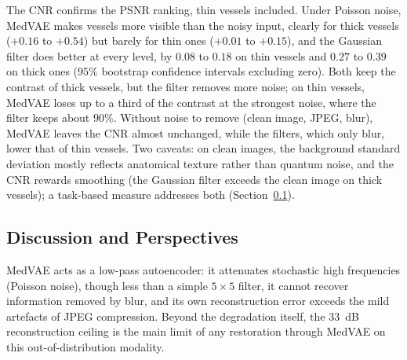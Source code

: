 \documentclass[conference]{IEEEtran}
\begin{document}
The CNR confirms the PSNR ranking, thin vessels included. Under Poisson
noise, MedVAE makes vessels more visible than the noisy input, clearly
for thick vessels ($+0.16$ to $+0.54$) but barely for thin ones ($+0.01$
to $+0.15$), and the Gaussian filter does better at every level, by
$0.08$ to $0.18$ on thin vessels and $0.27$ to $0.39$ on thick ones
($95\%$ bootstrap confidence intervals excluding zero). Both keep the
contrast of thick vessels, but the filter removes more noise; on thin
vessels, MedVAE loses up to a third of the contrast at the strongest
noise, where the filter keeps about $90\%$. Without noise to remove
(clean image, JPEG, blur), MedVAE leaves the CNR almost unchanged, while
the filters, which only blur, lower that of thin vessels. Two caveats:
on clean images, the background standard deviation mostly reflects
anatomical texture rather than quantum noise, and the CNR rewards
smoothing (the Gaussian filter exceeds the clean image on thick
vessels); a task-based measure addresses both
(Section~\ref{sec:discussion}).

\subsection{Discussion and Perspectives}
\label{sec:discussion}

MedVAE acts as a low-pass autoencoder: it attenuates stochastic high
frequencies (Poisson noise), though less than a simple $5\times5$
filter, it cannot recover information removed by blur, and its own
reconstruction error exceeds the mild artefacts of JPEG compression. Beyond the degradation itself, the
$33$~dB reconstruction ceiling is the main limit of any restoration
through MedVAE on this out-of-distribution modality.
\end{document}
